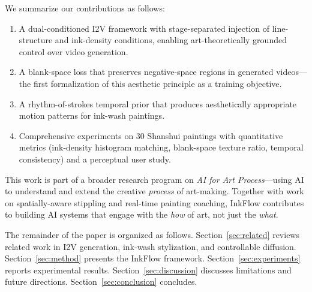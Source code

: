 We summarize our contributions as follows:
\begin{enumerate}
    \item A dual-conditioned I2V framework with stage-separated
    injection of line-structure and ink-density conditions, enabling
    art-theoretically grounded control over video generation.
    \item A blank-space loss that preserves negative-space regions
    in generated videos---the first formalization of this
    aesthetic principle as a training objective.
    \item A rhythm-of-strokes temporal prior that produces
    aesthetically appropriate motion patterns for ink-wash
    paintings.
    \item Comprehensive experiments on 30 Shanshui paintings with
    quantitative metrics (ink-density histogram matching,
    blank-space texture ratio, temporal consistency) and a
    perceptual user study.
\end{enumerate}

This work is part of a broader research program on \emph{AI for Art
Process}---using AI to understand and extend the creative
\emph{process} of art-making. Together with work on spatially-aware
stippling and real-time painting coaching, InkFlow contributes to
building AI systems that engage with the \emph{how} of art, not just
the \emph{what}.

The remainder of the paper is organized as follows.
Section~\ref{sec:related} reviews related work in I2V generation,
ink-wash stylization, and controllable diffusion.
Section~\ref{sec:method} presents the InkFlow framework.
Section~\ref{sec:experiments} reports experimental results.
Section~\ref{sec:discussion} discusses limitations and future
directions. Section~\ref{sec:conclusion} concludes.
